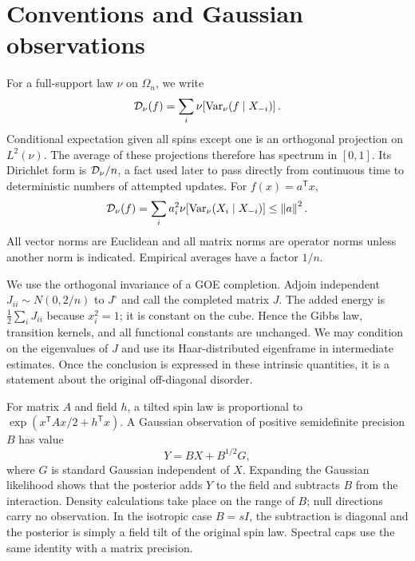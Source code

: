 \section{Conventions and Gaussian observations}\label{sec:model}

For a full-support law $\nu$ on $\Omega_n$, we write
\[
 \mathcal D_\nu(f)=\sum_i\nu\!\left[\operatorname{Var}_\nu(f\mid X_{-i})\right].
\]
Conditional expectation given all spins except one is an orthogonal
projection on $L^2(\nu)$. The average of these projections therefore has
spectrum in $[0,1]$. Its Dirichlet form is $\mathcal D_\nu/n$, a fact used later
to pass directly from continuous time to deterministic numbers of
attempted updates.
For $f(x)=a^{\mathsf T}x$,
\begin{equation}\label{eq:linear-energy}
 \mathcal D_\nu(f)=\sum_i a_i^2\nu\!\left[\operatorname{Var}_\nu(X_i\mid X_{-i})\right]
 \le\left\lVert a\right\rVert^2.
\end{equation}
All vector norms are Euclidean and all matrix norms are operator norms
unless another norm is indicated. Empirical averages have a factor $1/n$.

We use the orthogonal invariance of a GOE completion. Adjoin independent
$J_{ii}\sim N(0,2/n)$ to $J^\circ$ and call the completed matrix $J$.
The added energy is $\frac12\sum_iJ_{ii}$ because $x_i^2=1$; it is
constant on the cube. Hence the Gibbs law, transition kernels, and all
functional constants are unchanged. We may condition on the eigenvalues
of $J$ and use its Haar-distributed eigenframe in intermediate estimates.
Once the conclusion is expressed in these intrinsic quantities, it is
a statement about the original off-diagonal disorder.

For matrix $A$ and field $h$, a tilted spin law is proportional to
$\exp(x^{\mathsf T}Ax/2+h^{\mathsf T}x)$. A Gaussian observation of
positive semidefinite precision $B$ has value
\[
 Y=BX+B^{1/2}G,
\]
where $G$ is standard Gaussian independent of $X$. Expanding the
Gaussian likelihood shows that the posterior adds $Y$ to the field and
subtracts $B$ from the interaction. Density calculations take place on
the range of $B$; null directions carry no observation. In the isotropic
case $B=sI$, the subtraction is diagonal and the posterior is simply a
field tilt of the original spin law. Spectral caps use the same identity
with a matrix precision.

